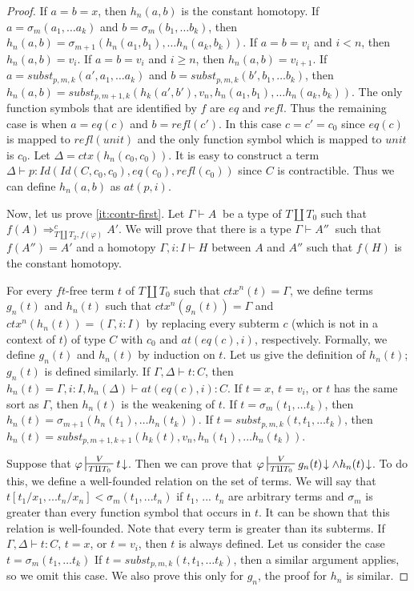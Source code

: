 \documentclass[reqno]{amsart}
\theoremstyle{definition}
\theoremstyle{remark}
\newcommand{\type}{}
\newcommand{\at}{\mathit{at}}
\newcommand{\unit}{\mathit{unit}}
\newcommand{\Ceq}{\mathit{eq}}
\newcommand{\Id}{\mathit{Id}}
\newcommand{\refl}{\mathit{refl}}
\newcommand{\subst}{\mathit{subst}}
\newcommand{\ft}{\mathit{ft}}
\newcommand{\ctx}{\mathit{ctx}}
\numberwithin{figure}{section}
\begin{document}
\begin{proof}
If $a = b = x$, then $h_n(a,b)$ is the constant homotopy.
If $a = \sigma_m(a_1, \ldots a_k)$ and $b = \sigma_m(b_1, \ldots b_k)$, then $h_n(a,b) = \sigma_{m+1}(h_n(a_1,b_1), \ldots h_n(a_k,b_k))$.
If $a = b = v_i$ and $i < n$, then $h_n(a,b) = v_i$.
If $a = b = v_i$ and $i \geq n$, then $h_n(a,b) = v_{i+1}$.
If $a = \subst_{p,m,k}(a', a_1, \ldots a_k)$ and $b = \subst_{p,m,k}(b', b_1, \ldots b_k)$, then $h_n(a,b) = \subst_{p,m+1,k}(h_k(a',b'), v_n, h_n(a_1,b_1), \ldots h_n(a_k,b_k))$.
The only function symbols that are identified by $f$ are $\Ceq$ and $\refl$.
Thus the remaining case is when $a = \Ceq(c)$ and $b = \refl(c')$.
In this case $c = c' = c_0$ since $\Ceq(c)$ is mapped to $\refl(\unit)$ and the only function symbol which is mapped to $\unit$ is $c_0$.
Let $\Delta = \ctx(h_n(c_0,c_0))$.
It is easy to construct a term $\Delta \vdash p : \Id(\Id(C,c_0,c_0),\Ceq(c_0),\refl(c_0))$ since $C$ is contractible.
Thus we can define $h_n(a,b)$ as $\at(p,i)$.

Now, let us prove \eqref{it:contr-first}.
Let $\Gamma \vdash A\ \type$ be a type of $T \amalg T_0$ such that $f(A) \Rightarrow_{T \amalg T_2, f(\varphi)}^c A'$.
We will prove that there is a type $\Gamma \vdash A''\ \type$ such that $f(A'') = A'$ and a homotopy $\Gamma, i : I \vdash H \type$ between $A$ and $A''$ such that $f(H)$ is the constant homotopy.

For every $\ft$-free term $t$ of $T \amalg T_0$ such that $\ctx^n(t) = \Gamma$, we define terms $g_n(t)$ and $h_n(t)$ such that $\ctx^n(g_n(t)) = \Gamma$ and $\ctx^n(h_n(t)) = (\Gamma, i : I)$
by replacing every subterm $c$ (which is not in a context of $t$) of type $C$ with $c_0$ and $\at(\Ceq(c),i)$, respectively.
Formally, we define $g_n(t)$ and $h_n(t)$ by induction on $t$.
Let us give the definition of $h_n(t)$; $g_n(t)$ is defined similarly.
If $\Gamma, \Delta \vdash t : C$, then $h_n(t) = \Gamma, i : I, h_n(\Delta) \vdash \at(\Ceq(c),i) : C$.
If $t = x$, $t = v_i$, or $t$ has the same sort as $\Gamma$, then $h_n(t)$ is the weakening of $t$.
If $t = \sigma_m(t_1, \ldots t_k)$, then $h_n(t) = \sigma_{m+1}(h_n(t_1), \ldots h_n(t_k))$.
If $t = \subst_{p,m,k}(t, t_1, \ldots t_k)$, then $h_n(t) = \subst_{p,m+1,k+1}(h_k(t), v_n, h_n(t_1), \ldots h_n(t_k))$.

Suppose that $\varphi \sststile{T \amalg T_0}{V} t\!\downarrow$.
Then we can prove that $\varphi \sststile{T \amalg T_0}{V} g_n(t)\!\downarrow \land h_n(t)\!\downarrow$.
To do this, we define a well-founded relation on the set of terms.
We will say that $t[t_1/x_1, ... t_n/x_n] < \sigma_m(t_1, ... t_n)$ if $t_1$, ... $t_n$ are arbitrary terms and $\sigma_m$ is greater than every function symbol that occurs in $t$.
It can be shown that this relation is well-founded.
Note that every term is greater than its subterms.
If $\Gamma, \Delta \vdash t : C$, $t = x$, or $t = v_i$, then $t$ is always defined.
Let us consider the case $t = \sigma_m(t_1, \ldots t_k)$
If $t = \subst_{p,m,k}(t, t_1, \ldots t_k)$, then a similar argument applies, so we omit this case.
We also prove this only for $g_n$, the proof for $h_n$ is similar.


\end{proof}
\end{document}
